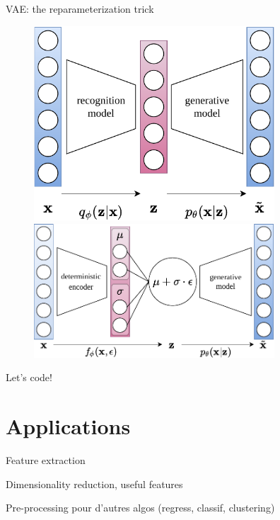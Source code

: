 \documentclass{beamer}
\begin{document}
  \begin{frame}{VAE: the reparameterization trick}

    \begin{figure}
      \includegraphics[width=9cm]{rc/vae}\\
      \includegraphics[width=9cm]{rc/vae-reparameterization}
    \end{figure}
    
  \end{frame}

  \begin{frame}{Let's code!}

    
  \end{frame}

  \section{Applications}

  \begin{frame}{Feature extraction}

    Dimensionality reduction, useful features

    Pre-processing pour d'autres algos (regress, classif, clustering)
    
  \end{frame}
\end{document}
